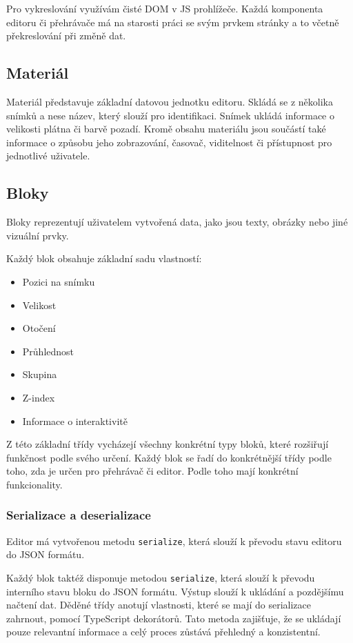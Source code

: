 Pro vykreslování využívám čisté DOM v JS prohlížeče.
Každá komponenta editoru či přehrávače má na starosti práci se svým prvkem stránky a to včetně překreslování při změně dat.

\subsection{Materiál}

Materiál představuje základní datovou jednotku editoru.
Skládá se z několika snímků a nese název, který slouží pro identifikaci. 
Snímek ukládá informace o velikosti plátna či barvě pozadí.
Kromě obsahu materiálu jsou součástí také informace o způsobu jeho zobrazování, časovač, viditelnost či přístupnost pro jednotlivé uživatele.

\subsection{Bloky}

Bloky reprezentují uživatelem vytvořená data, jako jsou texty, obrázky nebo jiné vizuální prvky. 

Každý blok obsahuje základní sadu vlastností: 

\begin{itemize}
	\item Pozici na snímku
	\item Velikost
	\item Otočení
	\item Průhlednost
	\item Skupina
	\item Z-index
	\item Informace o interaktivitě
\end{itemize}

Z této základní třídy vycházejí všechny konkrétní typy bloků, které rozšiřují funkčnost podle svého určení.
Každý blok se řadí do konkrétnější třídy podle toho, zda je určen pro přehrávač či editor.
Podle toho mají konkrétní funkcionality.

\subsubsection{Serializace a deserializace}

Editor má vytvořenou metodu \texttt{serialize}, která slouží k převodu stavu editoru do JSON formátu.

Každý blok taktéž disponuje metodou \texttt{serialize}, která slouží k převodu interního stavu bloku do JSON formátu. 
Výstup slouží k ukládání a pozdějšímu načtení dat. 
Děděné třídy anotují vlastnosti, které se mají do serializace zahrnout, pomocí TypeScript dekorátorů. 
Tato metoda zajišťuje, že se ukládají pouze relevantní informace a celý proces zůstává přehledný a konzistentní.


